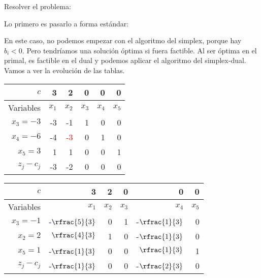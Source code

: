 \begin{example} Resolver el problema:

\begin{ioprob}
\end{ioprob}


Lo primero es pasarlo a forma estándar:


\begin{ioprob}
\end{ioprob}


En este caso, no podemos empezar con el algoritmo del simplex, porque hay $b_i< 0$. 
%
Pero tendríamos una solución óptima si fuera factible.
%
Al ser óptima en el primal, es factible en el dual y podemos aplicar el algoritmo del simplex-dual.
%
Vamos a ver la evolución de las tablas.



\begin{center}
\begin{tabular}{r | rrrrr}
$c$ & 3 & 2 & 0 & 0 & 0 \\ \hline
Variables & $x_1$ & $x_2$ & $x_3$ & $x_4$ & $x_5$ \\ \hline
$x_3 = -3$ & -3 & -1 & 1 & 0 & 0 \\
$x_4=  -6$   & -4 & \textcolor{red}{-3} & 0 & 1 & 0  \\
$x_5=3$ & 1 & 1 & 0 & 0 & 1 \\ \hline
$z_j-c_j$ & -3 & -2 & 0 & 0 & 0 
\end{tabular}
\end{center}


\begin{center}
\begin{tabular}{r | rrrrr}
$c$ & 3 & 2 & 0 & 0 & 0 \\ \hline
Variables & $x_1$ & $x_2$ & $x_3$ & $x_4$ & $x_5$ \\ \hline
$x_3 = -1$ & \textcolor{blue}{-$\rfrac{5}{3}$} & 0 & 1 & -$\rfrac{1}{3}$ & 0 \\
$x_2=  2$   & $\rfrac{4}{3}$ & 1 & 0 & -$\rfrac{1}{3}$ & 0  \\
$x_5=1$ & -$\rfrac{1}{3}$ & 0 & 0 & $\rfrac{1}{3}$ & 1 \\ \hline
$z_j-c_j$ & -$\rfrac{1}{3}$ & 0 & 0 & -$\rfrac{2}{3}$ & 0 
\end{tabular}
\end{center}



\end{example}
